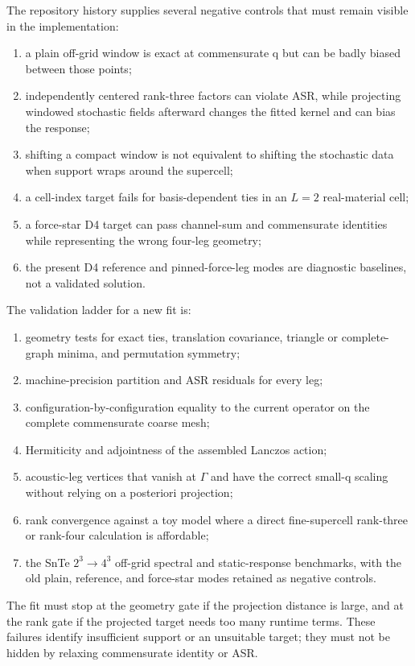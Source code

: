 \documentclass{article}
\begin{document}
The repository history supplies several negative controls that must remain
visible in the implementation:
\begin{enumerate}
    \item a plain off-grid window is exact at commensurate q but can be badly
    biased between those points;
    \item independently centered rank-three factors can violate ASR, while
    projecting windowed stochastic fields afterward changes the fitted
    kernel and can bias the response;
    \item shifting a compact window is not equivalent to shifting the
    stochastic data when support wraps around the supercell;
    \item a cell-index target fails for basis-dependent ties in an
    $L=2$ real-material cell;
    \item a force-star D4 target can pass channel-sum and commensurate
    identities while representing the wrong four-leg geometry;
    \item the present D4 reference and pinned-force-leg modes are diagnostic
    baselines, not a validated solution.
\end{enumerate}

The validation ladder for a new fit is:
\begin{enumerate}
    \item geometry tests for exact ties, translation covariance, triangle or
    complete-graph minima, and permutation symmetry;
    \item machine-precision partition and ASR residuals for every leg;
    \item configuration-by-configuration equality to the current operator
    on the complete commensurate coarse mesh;
    \item Hermiticity and adjointness of the assembled Lanczos action;
    \item acoustic-leg vertices that vanish at $\Gamma$ and have the correct
    small-q scaling without relying on a posteriori projection;
    \item rank convergence against a toy model where a direct fine-supercell
    rank-three or rank-four calculation is affordable;
    \item the SnTe $2^3\rightarrow4^3$ off-grid spectral and static-response
    benchmarks, with the old plain, reference, and force-star modes retained
    as negative controls.
\end{enumerate}

The fit must stop at the geometry gate if the projection distance is large,
and at the rank gate if the projected target needs too many runtime terms.
These failures identify insufficient support or an unsuitable target; they
must not be hidden by relaxing commensurate identity or ASR.
\end{document}
